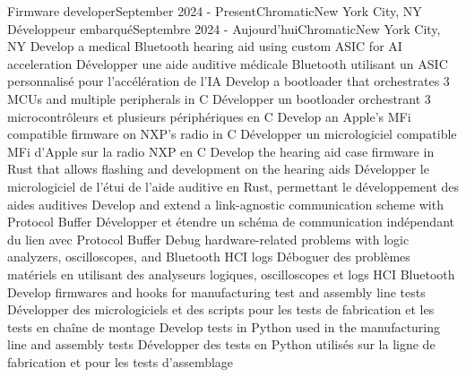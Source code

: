   \resumeSubHeadingListStart
      \resumeSubheadingEnFr
        {Firmware developer}{September 2024 - Present}{Chromatic}{New York City, NY}
        {Développeur embarqué}{Septembre 2024 - Aujourd'hui}{Chromatic}{New York City, NY}
            \resumeItemListStart
                \resumeItemEnFr
                    {Develop a medical Bluetooth hearing aid using custom ASIC for AI acceleration}
                    {Développer une aide auditive médicale Bluetooth utilisant un ASIC personnalisé pour l’accélération de l’IA}
                \resumeItemEnFr
                    {Develop a bootloader that orchestrates 3 MCUs and multiple peripherals in C}
                    {Développer un bootloader orchestrant 3 microcontrôleurs et plusieurs périphériques en C}
                \resumeItemEnFr
                    {Develop an Apple's MFi compatible firmware on NXP's radio in C}
                    {Développer un micrologiciel compatible MFi d’Apple sur la radio NXP en C}
                \resumeItemEnFr
                    {Develop the hearing aid case firmware in Rust that allows flashing and development on the hearing aids}
                    {Développer le micrologiciel de l’étui de l’aide auditive en Rust, permettant le développement des aides auditives}
                \resumeItemEnFr
                    {Develop and extend a link-agnostic communication scheme with Protocol Buffer}
                    {Développer et étendre un schéma de communication indépendant du lien avec Protocol Buffer}
                \resumeItemEnFr
                    {Debug hardware-related problems with logic analyzers, oscilloscopes, and Bluetooth HCI logs}
                    {Déboguer des problèmes matériels en utilisant des analyseurs logiques, oscilloscopes et logs HCI Bluetooth}
                \resumeItemEnFr
                    {Develop firmwares and hooks for manufacturing test and assembly line tests}
                    {Développer des micrologiciels et des scripts pour les tests de fabrication et les tests en chaîne de montage}
                \resumeItemEnFr
                    {Develop tests in Python used in the manufacturing line and assembly tests}
                    {Développer des tests en Python utilisés sur la ligne de fabrication et pour les tests d’assemblage}
            \resumeItemListEnd


